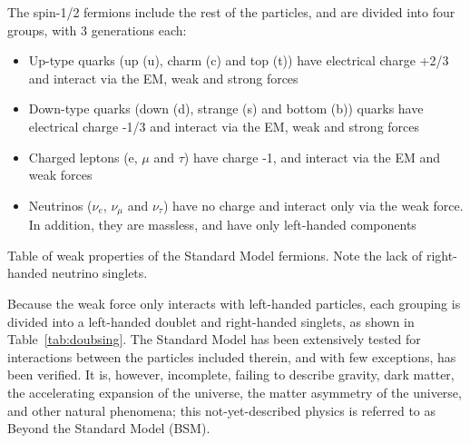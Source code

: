 \documentclass[/main.tex]{subfiles}
\begin{document}
The spin-1/2 fermions include the rest of the particles, and are divided into four groups, with 3 generations each:
\begin{itemize}
\item Up-type quarks (up (u), charm (c) and top (t)) have electrical charge +2/3 and interact via the EM, weak and strong forces
\item Down-type quarks (down (d), strange (s) and bottom (b)) quarks have electrical charge -1/3 and interact via the EM, weak and strong forces
\item Charged leptons (e, $\mu$ and $\tau$) have charge -1, and interact via the EM and weak forces
\item Neutrinos ($\nu_e$, $\nu_\mu$ and $\nu_\tau$) have no charge and interact only via the weak force. In addition, they are massless, and have only left-handed components
\end{itemize}
\begin{table}[h]
  \caption[Weak properties of Fermions]{\label{tab:doubsing}
    Table of weak properties of the Standard Model fermions. Note the lack of right-handed neutrino singlets.
  }
  \centering
  
\end{table}
Because the weak force only interacts with left-handed particles, each grouping is divided into a left-handed doublet and right-handed singlets, as shown in Table~\ref{tab:doubsing}.
The Standard Model has been extensively tested for interactions between the particles included therein, and with few exceptions, has been verified.
It is, however, incomplete, failing to describe gravity, dark matter, the accelerating expansion of the universe, the matter asymmetry of the universe, and other natural phenomena; this not-yet-described physics is referred to as Beyond the Standard Model (BSM).
\end{document}

